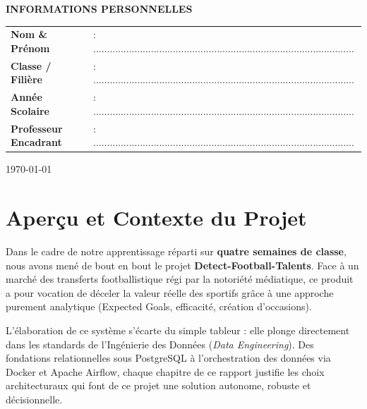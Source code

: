\documentclass[11pt, a4paper]{article}
\begin{document}
\begin{titlepage}
    \begin{tcolorbox}[colback=white,colframe=primary!40,arc=5pt,boxrule=1pt,width=0.9\textwidth,halign=left]
        \normalsize \textcolor{primary}{\textbf{\textsf{ INFORMATIONS PERSONNELLES}}} \\[0.3cm]
        \renewcommand{\arraystretch}{1.5}
        \begin{tabular}{ll}
            \textbf{Nom \& Prénom} & : ............................................................................................... \\
            \textbf{Classe / Filière} & : ............................................................................................... \\
            \textbf{Année Scolaire} & : ............................................................................................... \\
            \textbf{Professeur Encadrant} & : ............................................................................................... \\
        \end{tabular}
    \end{tcolorbox}
    
    \vspace{1.5cm}
    {\large \today \par}
\end{titlepage}

\tableofcontents
\newpage

\section{Aperçu et Contexte du Projet}

Dans le cadre de notre apprentissage réparti sur \textbf{quatre semaines de classe}, nous avons mené de bout en bout le projet \textbf{Detect-Football-Talents}. Face à un marché des transferts footballistique régi par la notoriété médiatique, ce produit a pour vocation de déceler la \og valeur réelle \fg{} des sportifs grâce à une approche purement analytique (Expected Goals, efficacité, création d'occasions).

L'élaboration de ce système s'écarte du simple tableur : elle plonge directement dans les standards de l'Ingénierie des Données (\textit{Data Engineering}). 
Des fondations relationnelles sous PostgreSQL à l'orchestration des données via Docker et Apache Airflow, chaque chapitre de ce rapport justifie les choix architecturaux qui font de ce projet une solution autonome, robuste et décisionnelle.
\end{document}
